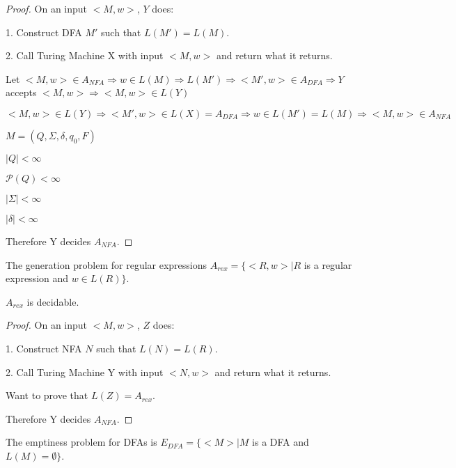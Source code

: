     \begin{proof}
        On an input $<M,w>$, $Y$ does:

        1. Construct DFA $M'$ such that $L(M')=L(M)$.

        2. Call Turing Machine X with input $<M,w>$ and return what it returns.


        Let $<M,w>\in A_{NFA} 
            \Rightarrow w\in L(M) 
            \Rightarrow L(M') 
            \Rightarrow <M',w>\in A_{DFA} 
            \Rightarrow Y$ accepts $<M,w> 
            \Rightarrow <M,w>\in L(Y)$

        $<M,w>\in L(Y) 
            \Rightarrow <M',w>\in L(X) = A_{DFA} 
            \Rightarrow w\in L(M') = L(M) 
            \Rightarrow <M,w>\in A_{NFA}$

        $M=(Q,\Sigma, \delta, q_0, F)$

            $|Q|<\infty$

            $\mathcal{P}(Q)<\infty$

            $|\Sigma|<\infty$

            $|\delta|<\infty$

        Therefore Y decides $A_{NFA}$.
    \end{proof}

    \begin{definition}
        The generation problem for regular expressions $A_{rex}=\{<R,w>|R$ is a regular expression and $w\in L(R)\}$.
    \end{definition}

    \begin{theorem}
        $A_{rex}$ is decidable.
    \end{theorem}

    \begin{proof}
        On an input $<M,w>$, $Z$ does:

        1. Construct NFA $N$ such that $L(N)=L(R)$.

        2. Call Turing Machine Y with input $<N,w>$ and return what it returns.


        Want to prove that $L(Z)=A_{rex}$.

        Therefore Y decides $A_{NFA}$.
    \end{proof}

    \begin{definition}
        The emptiness problem for DFAs is $E_{DFA} = \{<M>| M$ is a DFA and $L(M)=\emptyset \}$.
    \end{definition}

